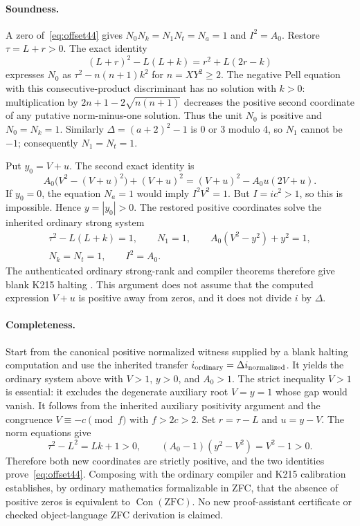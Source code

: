 \paragraph{Soundness.}
A zero of~\eqref{eq:offset44} gives
$N_0N_k=N_1N_t=N_a=1$ and $I^2=A_0$. Restore
$\tau=L+r>0$. The exact identity
\[
(L+r)^2-L(L+k)=r^2+L(2r-k)
\]
expresses $N_0$ as $\tau^2-n(n+1)k^2$ for $n=XY^2\ge2$.
The negative Pell equation with this consecutive-product discriminant
has no solution with $k>0$: multiplication by
$2n+1-2\sqrt{n(n+1)}$ decreases the positive second coordinate of any
putative norm-minus-one solution. Thus the unit $N_0$ is positive and
$N_0=N_k=1$. Similarly $\Delta=(a+2)^2-1$ is 0 or 3 modulo 4, so
$N_1$ cannot be $-1$; consequently $N_1=N_t=1$.

Put $y_0=V+u$. The second exact identity is
\[
A_0\bigl(V^2-(V+u)^2\bigr)+(V+u)^2
=(V+u)^2-A_0u(2V+u).
\]
If $y_0=0$, the equation $N_a=1$ would imply $I^2V^2=1$.
But $I=ic^2>1$, so this is impossible. Hence $y=|y_0|>0$.
The restored positive coordinates solve the inherited ordinary strong
system
\[
\begin{gathered}
\tau^2-L(L+k)=1,\qquad N_1=1,\qquad A_0(V^2-y^2)+y^2=1,\\
N_k=N_t=1,\qquad I^2=A_0.
\end{gathered}
\]
The authenticated ordinary strong-rank and compiler theorems therefore
give blank K215 halting \cite{package31}.
This argument does not assume that the computed expression $V+u$ is
positive away from zeros, and it does not divide $i$ by $\Delta$.

\paragraph{Completeness.}
Start from the canonical positive normalized witness supplied by a blank
halting computation and use the inherited transfer
$i_{\rm ordinary}=\Delta i_{\rm normalized}$. It yields the ordinary
system above with $V>1$, $y>0$, and $A_0>1$. The strict inequality $V>1$
is essential: it excludes the degenerate auxiliary root $V=y=1$ whose
gap would vanish. It follows from the inherited auxiliary positivity
argument and the congruence $V\equiv-c\pmod f$ with $f>2c>2$.
Set $r=\tau-L$ and $u=y-V$. The norm equations give
\[
\tau^2-L^2=Lk+1>0,\qquad
(A_0-1)(y^2-V^2)=V^2-1>0.
\]
Therefore both new coordinates are strictly positive, and the two
identities prove~\eqref{eq:offset44}. Composing with the ordinary compiler
and K215 calibration establishes, by ordinary mathematics formalizable
in ZFC, that the absence of positive zeros is equivalent to
$\operatorname{Con}(\mathrm{ZFC})$. No new proof-assistant certificate or
checked object-language ZFC derivation is claimed.

